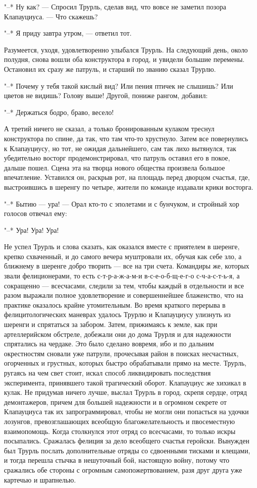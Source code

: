 "--* Ну как? --- Спросил Трурль, сделав вид, что вовсе не
заметил позора Клапауциуса. --- Что скажешь?

"--* Я приду завтра утром, --- ответил тот.

Разумеется,
уходя, удовлетворенно улыбался Трурль. На следующий день,
около полудня, снова вошли оба конструктора в город, и
увидели большие перемены. Остановил их сразу же патруль, и
старший по званию сказал Трурлю.

"--* Почему у тебя такой кислый вид? Или пения птичек не
слышишь? Или цветов не видишь? Голову выше! Другой, пониже
рангом, добавил:

"--* Держаться бодро, браво, весело!

А третий ничего не сказал, а только бронированным кулаком
треснул конструктора по спине, да так, что там что-то
хрустнуло. Затем все повернулись к Клапауциусу, но тот, не
ожидая дальнейшего, сам так лихо вытянулся, так убедительно
восторг продемонстрировал, что патруль оставил его в покое,
дальше пошел. Сцена эта на творца нового общества произвела
большое впечатление. Уставился он, раскрыв рот, на площадь
перед дворцом счастья, где, выстроившись в шеренгу по
четыре, жители по команде издавали крики восторга.

"--* Бытию --- ура! --- Орал кто-то с эполетами и с бунчуком,
и стройный хор голосов отвечал ему:

"--* Ура! Ура! Ура!

Не успел Трурль и слова сказать, как оказался вместе с
приятелем в шеренге, крепко схваченный, и до самого вечера
муштровали их, обучая как себе зло, а ближнему в шеренге
добро творить --- все на три счета. Командиры же, которых
звали фелиционерами, то есть с-т-р-а-ж-а-м-и
в-с-е-о-б-щ-е-г-о с-ч-а-с-т-ь-я, а сокращенно --- всесчасами,
следили за тем, чтобы каждый в отдельности и все разом
выражали полное удовлетворение и совершеннейшее блаженство,
что на практике оказалось крайне утомительным. Во время
краткого перерыва в фелицитологических маневрах удалось
Трурлю и Клапауциусу улизнуть из шеренги и спрятаться за
забором. Затем, прижимаясь к земле, как при артеллерийском
обстреле, добежали они до дома Трурля и для надежности
спрятались на чердаке. Это было сделано вовремя, ибо и по
дальним окрестностям сновали уже патрули, прочесывая район в
поисках несчастных, огорченных и грустных, которых быстро
обрабатывали прямо на месте. Трурль, ругаясь на чем свет
стоит, искал способ ликвидировать последствия эксперимента,
принявшего такой трагический оборот. Клапауциус же хихикал в
кулак. Не придумав ничего лучше, выслал Трурль в город,
скрепя сердце, отряд демонтажеров, причем для большей
надежности и в огромном секрете от Клапауциуса так их
запрограммировал, чтобы не могли они попасться на удочки
лозунгов, превозглашающих всеобщую благожелательность и
пвосеместную взаимопомощь. Когда столкнулся этот отряд со
всесчасами, то только искры посыпались. Сражалась фелиция за
дело всеобщего счастья геройски. Вынужден был Трурль послать
дополнительные отряды со сдвоенными тисками и клещами, и
тогда перешла стычка в нешуточный бой, настоящую войну,
потому что сражались обе стороны с огромным
самопожертвованием, разя друг друга уже картечью и
шрапнелью.

